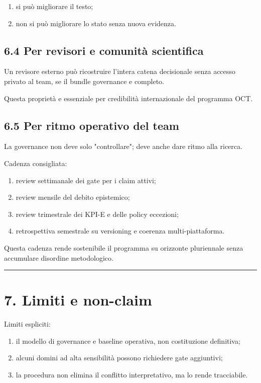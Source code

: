 \begin{enumerate}
\def\labelenumi{\arabic{enumi}.}
\tightlist
\item
  si può migliorare il testo;
\item
  non si può migliorare lo stato senza nuova evidenza.
\end{enumerate}

\subsection{6.4 Per revisori e comunità scientifica}

Un revisore esterno può ricostruire l'intera catena decisionale senza accesso privato al team, se il bundle governance e completo.

Questa proprietà e essenziale per credibilità internazionale del programma OCT.

\subsection{6.5 Per ritmo operativo del team}

La governance non deve solo "controllare"; deve anche dare ritmo alla ricerca.

Cadenza consigliata:

\begin{enumerate}
\def\labelenumi{\arabic{enumi}.}
\tightlist
\item
  review settimanale dei gate per i claim attivi;
\item
  review mensile del debito epistemico;
\item
  review trimestrale dei KPI-E e delle policy eccezioni;
\item
  retrospettiva semestrale su versioning e coerenza multi-piattaforma.
\end{enumerate}

Questa cadenza rende sostenibile il programma su orizzonte pluriennale senza accumulare disordine metodologico.

\begin{center}\rule{0.5\linewidth}{0.5pt}\end{center}

\section{7. Limiti e non-claim}

Limiti espliciti:

\begin{enumerate}
\def\labelenumi{\arabic{enumi}.}
\tightlist
\item
  il modello di governance e baseline operativa, non costituzione definitiva;
\item
  alcuni domini ad alta sensibilità possono richiedere gate aggiuntivi;
\item
  la procedura non elimina il conflitto interpretativo, ma lo rende tracciabile.
\end{enumerate}

